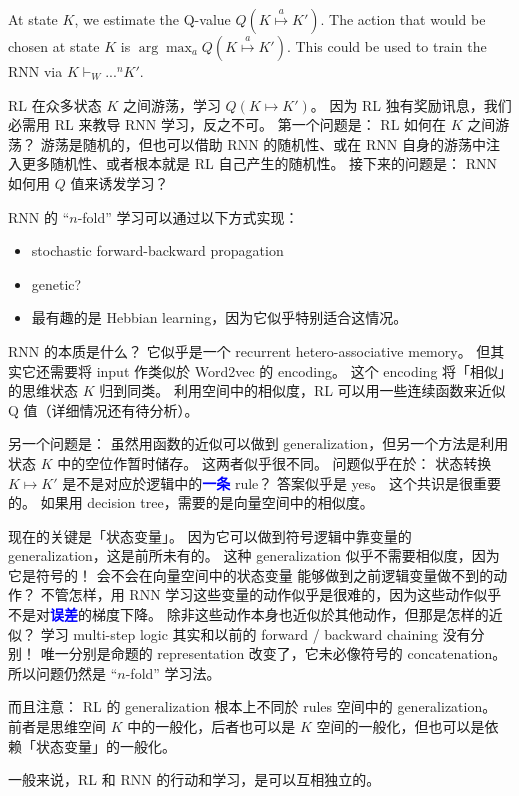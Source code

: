 \documentclass[orivec]{llncs}
\newcommand{\emp}[1]{\textbf{\textcolor{blue}{#1}}}
\begin{document}
At state $K$, we estimate the Q-value $Q(K \stackrel{a}{\mapsto} K')$.  The action that would be chosen at state $K$ is $\displaystyle \arg\max_a Q(K \stackrel{a}{\mapsto} K')$.  This could be used to train the RNN via $\displaystyle K \vdash_W ...^n K'$.

RL 在众多状态 $K$ 之间游荡，学习 $Q(K \mapsto K')$。  因为 RL 独有奖励讯息，我们必需用 RL 来教导 RNN 学习，反之不可。  第一个问题是： RL 如何在 $K$ 之间游荡？   游荡是随机的，但也可以借助 RNN 的随机性、或在 RNN 自身的游荡中注入更多随机性、或者根本就是 RL 自己产生的随机性。  接下来的问题是： RNN 如何用 $Q$ 值来诱发学习？

RNN 的 ``$n$-fold'' 学习可以通过以下方式实现： 
\begin{itemize}
\item stochastic forward-backward propagation
\item genetic?
\item 最有趣的是 Hebbian learning，因为它似乎特别适合这情况。  
\end{itemize}

RNN 的本质是什么？  它似乎是一个 recurrent hetero-associative memory。  但其实它还需要将 input 作类似於 Word2vec 的 encoding。  这个 encoding 将「相似」的思维状态 $K$ 归到同类。  利用空间中的相似度，RL 可以用一些连续函数来近似 Q 值（详细情况还有待分析）。

另一个问题是： 虽然用函数的近似可以做到 generalization，但另一个方法是利用状态 $K$ 中的空位作暂时储存。 这两者似乎很不同。  问题似乎在於： 状态转换 $K \mapsto K'$ 是不是对应於逻辑中的\emp{一条} rule？  答案似乎是 yes。  这个共识是很重要的。  如果用 decision tree，需要的是向量空间中的相似度。

现在的关键是「状态变量」。  因为它可以做到符号逻辑中靠变量的 generalization，这是前所未有的。  这种 generalization 似乎不需要相似度，因为它是符号的！  会不会在向量空间中的状态变量 能够做到之前逻辑变量做不到的动作？  不管怎样，用 RNN 学习这些变量的动作似乎是很难的，因为这些动作似乎不是对\emp{误差}的梯度下降。  除非这些动作本身也近似於其他动作，但那是怎样的近似？  学习 multi-step logic 其实和以前的 forward / backward chaining 没有分别！  唯一分别是命题的 representation 改变了，它未必像符号的 concatenation。  所以问题仍然是 ``$n$-fold'' 学习法。 

而且注意： RL 的 generalization 根本上不同於 rules 空间中的 generalization。 前者是思维空间 $K$ 中的一般化，后者也可以是 $K$ 空间的一般化，但也可以是依赖「状态变量」的一般化。

一般来说，RL 和 RNN 的行动和学习，是可以互相独立的。  
\end{document}
